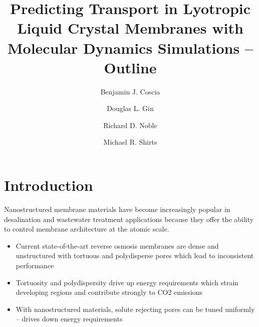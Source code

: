 \documentclass{article}
\title{Predicting Transport in Lyotropic Liquid Crystal Membranes with Molecular Dynamics Simulations -- Outline}
\author{Benjamin J. Coscia \and Douglas L. Gin \and Richard D. Noble \and Michael R. Shirts} %
\begin{document}
	
	\maketitle
	\section{Introduction}
	Nanostructured membrane materials have become increasingly popular in desalination and wastewater treatment applications because they offer the ability to control membrane architecture at the atomic scale.
	\begin{itemize}
		\item Current state-of-the-art reverse osmosis membranes are dense and unstructured with tortuous and polydisperse pores which lead to inconsistent performance
		\item Tortuosity and polydispersity drive up energy requirements which strain developing regions and contribute strongly to CO2 emissions
		\item With nanostructured materials, solute rejecting pores can be tuned uniformly -- drives down energy requirements
	\end{itemize}
	
\end{document}
